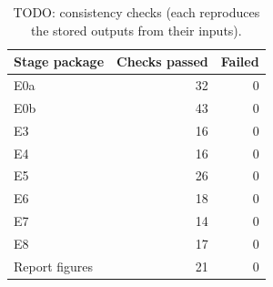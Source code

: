 \begin{table}
\centering
\small
\begin{tabular}{lrr}
\toprule
Stage package & Checks passed & Failed \\
\midrule
E0a & 32 & 0 \\
E0b & 43 & 0 \\
E3 & 16 & 0 \\
E4 & 16 & 0 \\
E5 & 26 & 0 \\
E6 & 18 & 0 \\
E7 & 14 & 0 \\
E8 & 17 & 0 \\
Report figures & 21 & 0 \\
\bottomrule
\end{tabular}
\caption{TODO: consistency checks (each reproduces the stored outputs from their inputs).}
\label{tab:checks}
\end{table}
